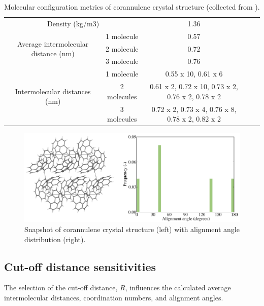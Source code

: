 \begin{table}[]
\centering
\caption{Molecular configuration metrics of corannulene crystal structure (collected from \cite{CORANN11unitcell}).}
\label{table:crystal}
\begin{tabular}{cc|cll}
\multicolumn{2}{c}{Density (kg/m3)} & 1.36 \cite{CORANN11unitcell}&  &  \\ \cline{1-3}
\multirow{3}{*}{Average intermolecular distance (nm)} & 1 molecule & 0.57 &  &  \\
 & 2 molecule & 0.72 &  &  \\
 & 3 molecule & 0.76 &  &  \\ \cline{1-3}
\multirow{3}{*}{Intermolecular distances (nm)} & 1 molecule & 0.55 x 10, 0.61 x 6 &  &  \\
 & 2 molecules & 0.61 x 2, 0.72 x 10, 0.73 x 2, 0.76 x 2, 0.78 x 2 &  &  \\
 & 3 molecules & 0.72 x 2, 0.73 x 4, 0.76 x 8, 0.78 x 2, 0.82 x 2 &  & 
\end{tabular}
\end{table}
%
%
\begin{figure}[!tbh]
\centering
\includegraphics[width=0.65\linewidth]{Figures/corannulene_crystal.eps}
\caption{Snapshot of corannulene crystal structure (left) with alignment angle distribution (right).}
\label{fig:corannulene_crystal}
\end{figure}
%

\subsection{Cut-off distance sensitivities}
The selection of the cut-off distance, $R$, influences the calculated average intermolecular distances, coordination numbers, and alignment angles.

